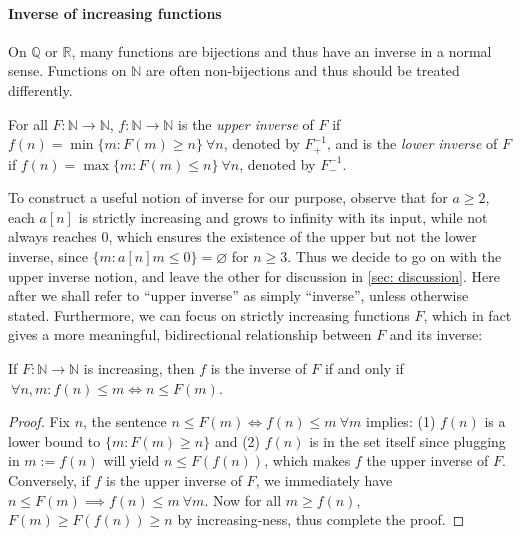 \paragraph{Inverse of increasing functions} On $\mathbb{Q}$ or $\mathbb{R}$, many functions are bijections and thus have an inverse in a normal sense. Functions on $\mathbb{N}$ are often non-bijections and thus should be treated differently.
\begin{defn} \label{defn: inverse}
	For all $F:\mathbb{N}\to \mathbb{N}$, $f:\mathbb{N}\to \mathbb{N}$ is the \emph{upper inverse} of $F$ if $f(n) = \min\{m : F(m)\ge n\} \ \forall n$, denoted by $F^{-1}_+$, and is the \emph{lower inverse} of $F$ if $f(n) = \max\{m : F(m)\le n\} \ \forall n$, denoted by $F^{-1}_-$.
\end{defn}
To construct a useful notion of inverse for our purpose, observe that for $a\ge 2$, each $a[n]$ is strictly increasing and grows to infinity with its input, while not always reaches $0$, which ensures the existence of the upper but not the lower inverse, since $\{m : a[n]m \le 0 \} = \varnothing$ for $n\ge 3$. Thus we decide to go on with the upper inverse notion, and leave the other for discussion in \cref{sec: discussion}. Here after we shall refer to ``upper inverse'' as simply ``inverse'', unless otherwise stated. Furthermore, we can focus on strictly increasing functions $F$, which in fact gives a more meaningful, bidirectional relationship between $F$ and its inverse:
\begin{thm} \label{thm: upp-inverse-rel}
	If $F:\mathbb{N}\to \mathbb{N}$ is increasing, then $f$ is the inverse of $F$ if and only if $\ \forall n, m : f(n)\le m \iff n \le F(m)$.
\end{thm}
\begin{proof}
Fix $n$, the sentence $n\le F(m) \iff f(n)\le m \ \forall m$ implies: (1) $f(n)$ is a lower bound to $\{m: F(m)\ge n \}$ and (2) $f(n)$ is in the set itself since plugging in $m := f(n)$ will yield $n\le F(f(n))$, which makes $f$ the upper inverse of $F$. Conversely, if $f$ is the upper inverse of $F$, we immediately have $n\le F(m)\implies f(n)\le m \ \forall m$. Now for all $m \ge f(n)$, $F(m)\ge F(f(n)) \ge n$ by increasing-ness, thus complete the proof.
\end{proof}


